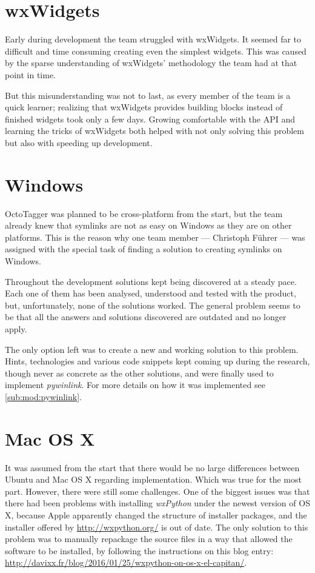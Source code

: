 \section{wxWidgets}

Early during development the team struggled with wxWidgets. It seemed far to
difficult and time consuming creating even the simplest widgets. This was
caused by the sparse understanding of wxWidgets' methodology the team had at
that point in time.

But this misunderstanding was not to last, as every member of the team is a
quick learner; realizing that wxWidgets provides building blocks instead of
finished widgets took only a few days. Growing comfortable with the API and
learning the tricks of wxWidgets both helped with not only solving this problem
but also with speeding up development.

\section{Windows}

OctoTagger was planned to be cross-platform from the start, but the team
already knew that symlinks are not as easy on Windows as they are on other
platforms. This is the reason why one team member --- Christoph Führer --- was
assigned with the special task of finding a solution to creating symlinks on
Windows.

Throughout the development solutions kept being discovered at a steady pace.
Each one of them has been analysed, understood and tested with the product,
but, unfortunately, none of the solutions worked. The general problem seems to
be that all the answers and solutions discovered are outdated and no longer
apply.

The only option left was to create a new and working solution to this problem.
Hints, technologies and various code snippets kept coming up during the
research, though never as concrete as the other solutions, and were finally
used to implement \emph{pywinlink}. For more details on how it was implemented
see \cref{sub:mod:pywinlink}.

\section{Mac OS X}

It was assumed from the start that there would be no large differences between
Ubuntu and Mac OS X regarding implementation. Which was true for the most part.
However, there were still some challenges. One of the biggest issues was
that there had been problems with installing \emph{wxPython}  under the newest 
version of OS X, because Apple apparently changed the structure of installer packages,
and the installer offered by \url{http://wxpython.org/} is out of date. The only solution to this problem was to manually repackage the source files in a way that allowed the software to be installed, by following the instructions on this blog entry: \url{http://davixx.fr/blog/2016/01/25/wxpython-on-os-x-el-capitan/}.

